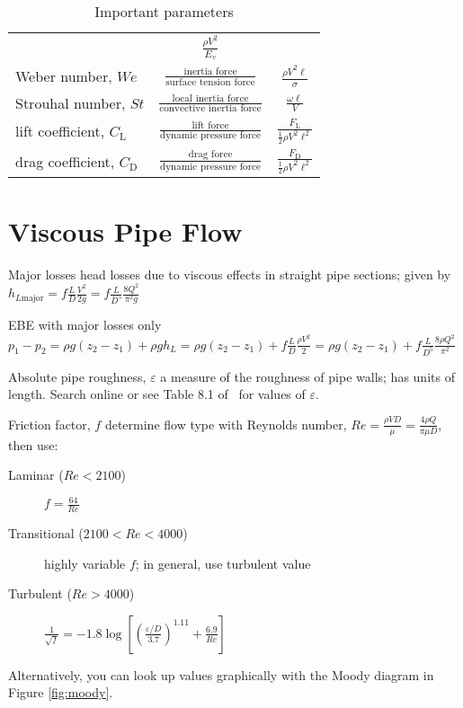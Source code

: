 \documentclass{article}
\begin{document}
\begin{table}
{\begin{tabu}{lcc}
  & \(\frac{\rho{}V^2}{E_v}\) \\
  Weber number, \(\mathit{We}\) & \(\frac{\textrm{inertia force}}{\textrm{surface tension force}}\)
  & \(\frac{\rho{}V^2\ell}{\sigma}\) \\
  Strouhal number, \(\mathit{St}\)
  & \(\frac{\textrm{local inertia force}}{\textrm{convective inertia force}}\)
  & \(\frac{\omega\ell}{V}\) \\
  lift coefficient, \(C_\mathrm{L}\) & \(\frac{\textrm{lift force}}{\textrm{dynamic pressure force}}\)
  & \(\frac{F_\mathrm{L}}{\frac12\rho{}V^2\ell^2}\) \\
  drag coefficient, \(C_\mathrm{D}\) & \(\frac{\textrm{drag force}}{\textrm{dynamic pressure force}}\)
  & \(\frac{F_\mathrm{D}}{\frac12\rho{}V^2\ell^2}\) \\
  \bottomrule
  \end{tabu}}
  \caption{Important parameters}\label{tab:params}
\end{table}

\section{Viscous Pipe Flow}

\begin{description*}
\item[Major losses] head losses due to viscous effects in straight pipe sections; given by
  \(h_{L\mathrm{major}} = f\frac{L}{D}\frac{V^2}{2g} = f\frac{L}{D^5}\frac{8Q^2}{\pi^2g}\)
\item[EBE with major losses only]
  \(p_1-p_2 = \rho{}g(z_2-z_1)+\rho{}gh_L = \rho{}g(z_2-z_1) + f\frac{L}{D}\frac{\rho{}V^2}{2}
  = \rho{}g(z_2-z_1) + f\frac{L}{D^5}\frac{8\rho{}Q^2}{\pi^2}\)
\item[Absolute pipe roughness, $\varepsilon$] a measure of the roughness of pipe walls; has units of
  length. Search online or see Table 8.1 of~\cite{fofm} for values of $\varepsilon$.
\item[Friction factor, $f$] determine flow type with Reynolds number,
  \(\mathit{Re} = \frac{\rho{}VD}{\mu} = \frac{4\rho{}Q}{\pi\mu{}D}\), then use:
  \begin{description}
  \item[Laminar (\(\mathit{Re}<2100\))]
    \(f = \frac{64}{\mathit{Re}}\)
  \item[Transitional (\(2100<\mathit{Re}<4000\))]
    highly variable $f$; in general, use turbulent value
  \item[Turbulent (\(\mathit{Re}>4000\))]
    \(\frac{1}{\sqrt{f}}
    = -1.8\log\left[\left(\frac{\varepsilon/D}{3.7}\right)^{1.11}
      + \frac{6.9}{\mathit{Re}}\right]\)
  \end{description}
  Alternatively, you can look up values graphically with the Moody diagram in Figure
  \ref{fig:moody}.
\end{description*}
\end{document}
